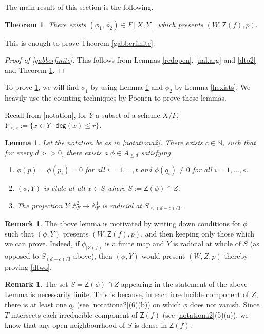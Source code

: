 \documentclass[10pt]{amsart}
\theoremstyle{plain}
\newtheorem{theorem}[thm]{Theorem}
\newtheorem{lemma}[thm]{Lemma}
\theoremstyle{definition}
\newtheorem{remark}[thm]{Remark}
\newcommand{\A}{{\mathbb A}}
\newcommand{\N}{{\mathbb N}}
\let\syn\mathsf
\newcommand{\scr}{\scriptscriptstyle}
\newcommand{\dg}{\syn{deg}}
\begin{document}
The main result of this section is the following. 
\begin{theorem}\label{dtwo}
There exists $(\phi_1,\phi_2)\in F[X,Y]$ which presents $(W,\syn{Z}(f),p).$ 
\end{theorem}

This is enough to prove Theorem \ref{gabberfinite}. 
\begin{proof}[Proof of \ref{gabberfinite}]
This follows from Lemmas \ref{redopen}, \ref{nakarg} and \ref{dto2} and Theorem \ref{dtwo}. 
\end{proof}



To prove \ref{dtwo}, we will find $\phi_1$ by using Lemma \ref{phiexists} and $\phi_2$ by Lemma \ref{hexists}. We heavily use the counting techniques by Poonen \cite{poonen} to prove these lemmas.

Recall from \ref{notation}, for $Y$ a subset of a scheme $X/F$,  $Y_{ \scr \leq r}:= \{x\in Y\ |\ \dg(x) \leq r\}$. 

\begin{lemma}\label{phiexists}
 Let the notation be as in \ref{notationa2}. There exists  $c\in \N$, such that for every $d>>0$, there exists a $\phi \in A_{\scr \leq d}$  satisfying 
 \begin{enumerate}
  \item $\phi(p)=\phi(p_i)=0$ for all $i=1,...,t$ and  $ \phi(q_i) \neq 0 $ for all $i=1,\ldots, s$.
  \item $ (\phi,Y)$ is \'{e}tale at all $x\in S$ where $S:=\syn{Z}(\phi) \cap Z$.
  \item The projection $Y:\A^2_F \to \A^1_F$ is radicial at $S_{\scr \leq {(d-c)}/{3}}$.  
  \end{enumerate}
 \end{lemma}

\begin{remark}\label{strategy} The above lemma is motivated by writing down conditions for $\phi$ such that $(\phi,Y)$ presents $(W,\syn{Z}(f),p)$, and then keeping only those which we can prove. Indeed, if  $\phi_{\scr | Z(f)}$ is a finite map and $Y$ is radicial at whole of $S$ (as opposed to $S_{\scr (d-c)/{3}}$ above), then $(\phi,Y)$ would present $(W,Z,p)$ thereby proving \eqref{dtwo}. 
\end{remark}

\begin{remark}\label{sfinite}
The set $S=\syn{Z}(\phi) \cap Z$ appearing in the statement of the above Lemma is necessarily finite. This is because, in each irreducible component of $Z$, there is at least one $q_i$ (see \eqref{notationa2}(6)(b)) on which $\phi$ does not vanish. Since $T$ intersects each irreducible component of $\syn{Z}(f)$ (see \eqref{notationa2}(5)(a)), we know that any open neighbourhood of $S$ is dense in $\syn{Z}(f)$. 
\end{remark}
\end{document}
